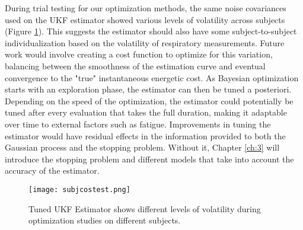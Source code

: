 During trial testing for our optimization methods, the same noise covariances used on the UKF estimator showed various levels of volatility across subjects (Figure \ref{fig:subjcostest}). This suggests the estimator should also have some subject-to-subject individualization based on the volatility of respiratory measurements. Future work would involve creating a cost function to optimize for this variation, balancing between the smoothness of the estimation curve and eventual convergence to the "true" instantaneous energetic cost. As Bayesian optimization starts with an exploration phase, the estimator can then be tuned a posteriori. Depending on the speed of the optimization, the estimator could potentially be tuned after every evaluation that takes the full duration, making it adaptable over time to external factors such as fatigue. Improvements in tuning the estimator would have residual effects in the information provided to both the Gaussian process and the stopping problem. Without it, Chapter \ref{ch:3} will introduce the stopping problem and different models that take into account the accuracy of the estimator. 

\begin{figure}[t]
\centering
\texttt{[image: subjcostest.png]}
\caption{Tuned UKF Estimator shows different levels of volatility during optimization studies on different subjects.}
\label{fig:subjcostest}
\end{figure}
